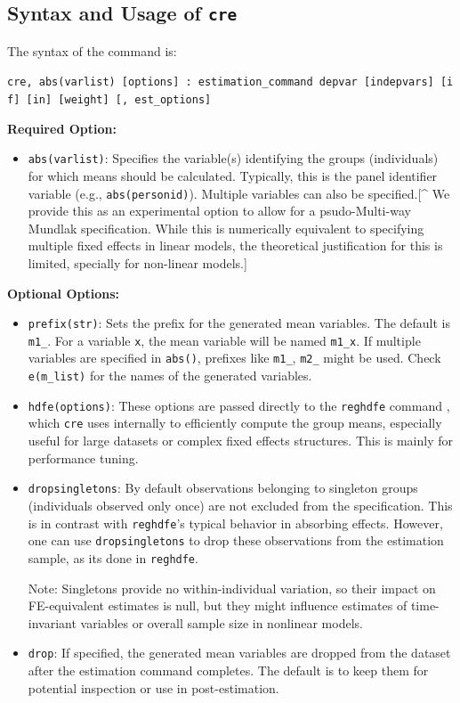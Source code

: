 \documentclass[bib]{statapress}
\providecommand{\tightlist}{%
  \setlength{\itemsep}{0pt}\setlength{\parskip}{0pt}}\usepackage{longtable,booktabs,array}
\begin{document}
\subsection{\texorpdfstring{Syntax and Usage of
\texttt{cre}}{Syntax and Usage of cre}}\label{syntax-and-usage-of-cre}

The syntax of the command is:

\texttt{cre,\ abs(varlist)\ {[}options{]}\ :\ estimation\_command\ depvar\ {[}indepvars{]}\ {[}if{]}\ {[}in{]}\ {[}weight{]}\ {[},\ est\_options{]}}

\textbf{Required Option:}

\begin{itemize}
\tightlist
\item
  \texttt{abs(varlist)}: Specifies the variable(s) identifying the
  groups (individuals) for which means should be calculated. Typically,
  this is the panel identifier variable (e.g., \texttt{abs(personid)}).
  Multiple variables can also be specified.{[}\^{} We provide this as an
  experimental option to allow for a psudo-Multi-way Mundlak
  specification. While this is numerically equivalent to specifying
  multiple fixed effects in linear models, the theoretical justification
  for this is limited, specially for non-linear models.{]}
\end{itemize}

\textbf{Optional Options:}

\begin{itemize}
\item
  \texttt{prefix(str)}: Sets the prefix for the generated mean
  variables. The default is \texttt{m1\_}. For a variable \texttt{x},
  the mean variable will be named \texttt{m1\_x}. If multiple variables
  are specified in \texttt{abs()}, prefixes like \texttt{m1\_},
  \texttt{m2\_} might be used. Check \texttt{e(m\_list)} for the names
  of the generated variables.
\item
  \texttt{hdfe(options)}: These options are passed directly to the
  \texttt{reghdfe} command \citep{correia_2016}, which \texttt{cre} uses
  internally to efficiently compute the group means, especially useful
  for large datasets or complex fixed effects structures. This is mainly
  for performance tuning.
\item
  \texttt{dropsingletons}: By default observations belonging to
  singleton groups (individuals observed only once) are not excluded
  from the specification. This is in contrast with \texttt{reghdfe}'s
  typical behavior in absorbing effects. However, one can use
  \texttt{dropsingletons} to drop these observations from the estimation
  sample, as its done in \texttt{reghdfe}.

  Note: Singletons provide no within-individual variation, so their
  impact on FE-equivalent estimates is null, but they might influence
  estimates of time-invariant variables or overall sample size in
  nonlinear models.
\item
  \texttt{drop}: If specified, the generated mean variables are dropped
  from the dataset after the estimation command completes. The default
  is to keep them for potential inspection or use in post-estimation.
\end{itemize}
\end{document}
